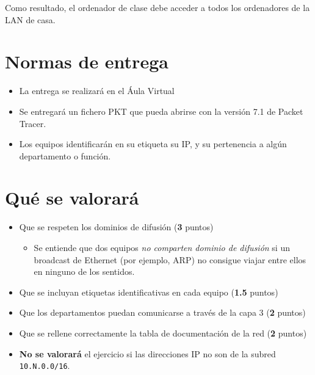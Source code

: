 Como resultado, el ordenador de clase debe acceder a todos los ordenadores de la LAN de casa.

\section{Normas de entrega}
\begin{itemize}
  
\item La entrega se realizará en el Áula Virtual
\item Se entregará un fichero PKT que pueda abrirse con la versión 7.1 de Packet Tracer.
\item Los equipos identificarán en su etiqueta su IP, y su pertenencia a algún departamento o función.
\end{itemize}

\section{Qué se valorará}
\begin{itemize}
\item Que se respeten los dominios de difusión (\textbf{3} puntos)
  \begin{itemize}
  \item Se entiende que dos equipos \textit{no comparten dominio de difusión} si un broadcast de Ethernet (por ejemplo, ARP) no consigue viajar entre ellos en ninguno de los sentidos.
  \end{itemize}
\item Que se incluyan etiquetas identificativas en cada equipo (\textbf{1.5} puntos)  
\item Que los departamentos puedan comunicarse a través de la capa 3 (\textbf{2} puntos)
\item Que se rellene correctamente la tabla de documentación de la red (\textbf{2} puntos)
\item \textbf{No se valorará} el ejercicio si las direcciones IP no son de la subred \texttt{10.N.0.0/16}.
\end{itemize}





